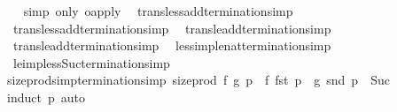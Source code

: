 \begin{isabellebody}
%
\isadelimproof
\ \ %
\endisadelimproof
%
\isatagproof
{}\isamarkupfalse%
\ {\isacharparenleft}{\kern0pt}simp\ only{\isacharcolon}{\kern0pt}\ o{\isacharunderscore}{\kern0pt}apply{\isacharparenright}{\kern0pt}%
\endisatagproof
{\isafoldproof}%
%
\isadelimproof
%
\endisadelimproof
%
\isadelimdocument
%
\endisadelimdocument
%
\isatagdocument
%
\isamarkuptrue%
%
\endisatagdocument
{\isafolddocument}%
%
\isadelimdocument
%
\endisadelimdocument
{}\isamarkupfalse%
\isanewline
\ \ trans{\isacharunderscore}{\kern0pt}less{\isacharunderscore}{\kern0pt}add{}{\isacharbrackleft}{\kern0pt}termination{\isacharunderscore}{\kern0pt}simp{\isacharbrackright}{\kern0pt}\isanewline
\ \ trans{\isacharunderscore}{\kern0pt}less{\isacharunderscore}{\kern0pt}add{}{\isacharbrackleft}{\kern0pt}termination{\isacharunderscore}{\kern0pt}simp{\isacharbrackright}{\kern0pt}\isanewline
\ \ trans{\isacharunderscore}{\kern0pt}le{\isacharunderscore}{\kern0pt}add{}{\isacharbrackleft}{\kern0pt}termination{\isacharunderscore}{\kern0pt}simp{\isacharbrackright}{\kern0pt}\isanewline
\ \ trans{\isacharunderscore}{\kern0pt}le{\isacharunderscore}{\kern0pt}add{}{\isacharbrackleft}{\kern0pt}termination{\isacharunderscore}{\kern0pt}simp{\isacharbrackright}{\kern0pt}\isanewline
\ \ less{\isacharunderscore}{\kern0pt}imp{\isacharunderscore}{\kern0pt}le{\isacharunderscore}{\kern0pt}nat{\isacharbrackleft}{\kern0pt}termination{\isacharunderscore}{\kern0pt}simp{\isacharbrackright}{\kern0pt}\isanewline
\ \ le{\isacharunderscore}{\kern0pt}imp{\isacharunderscore}{\kern0pt}less{\isacharunderscore}{\kern0pt}Suc{\isacharbrackleft}{\kern0pt}termination{\isacharunderscore}{\kern0pt}simp{\isacharbrackright}{\kern0pt}\isanewline
\isanewline
{}\isamarkupfalse%
\ size{\isacharunderscore}{\kern0pt}prod{\isacharunderscore}{\kern0pt}simp{\isacharbrackleft}{\kern0pt}termination{\isacharunderscore}{\kern0pt}simp{\isacharbrackright}{\kern0pt}{\isacharcolon}{\kern0pt}\ {\isachardoublequoteopen}size{\isacharunderscore}{\kern0pt}prod\ f\ g\ p\ {\isacharequal}{\kern0pt}\ f\ {\isacharparenleft}{\kern0pt}fst\ p{\isacharparenright}{\kern0pt}\ {\isacharplus}{\kern0pt}\ g\ {\isacharparenleft}{\kern0pt}snd\ p{\isacharparenright}{\kern0pt}\ {\isacharplus}{\kern0pt}\ Suc\ {}{\isachardoublequoteclose}\isanewline
%
\isadelimproof
\ \ %
\endisadelimproof
%
\isatagproof
{}\isamarkupfalse%
\ {\isacharparenleft}{\kern0pt}induct\ p{\isacharparenright}{\kern0pt}\ auto%
\endisatagproof

\end{isabellebody}
